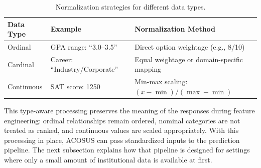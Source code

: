 \documentclass[letterpaper,11pt]{article}
\begin{document}
\begin{table}[htbp]
\centering
\caption{Normalization strategies for different data types.}
\label{tab:normalization}
\begin{tabular}{@{}lll@{}}
\toprule
\textbf{Data Type} & \textbf{Example} & \textbf{Normalization Method} \\
\midrule
Ordinal & GPA range: ``3.0--3.5'' & Direct option weightage (e.g., 8/10) \\
Cardinal & Career: ``Industry/Corporate'' & Equal weightage or domain-specific mapping \\
Continuous & SAT score: 1250 & Min-max scaling: $(x - \min)/(\max - \min)$ \\
\bottomrule
\end{tabular}
\end{table}

This type-aware processing preserves the meaning of the responses during feature engineering: ordinal relationships remain ordered, nominal categories are not treated as ranked, and continuous values are scaled appropriately. With this processing in place, ACOSUS can pass standardized inputs to the prediction pipeline. The next subsection explains how that pipeline is designed for settings where only a small amount of institutional data is available at first.
\end{document}
